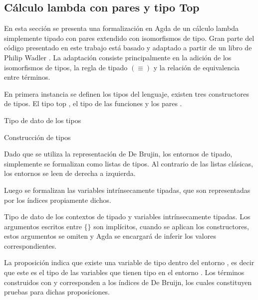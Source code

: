 \subsection{Cálculo lambda con pares y tipo Top}

En esta sección se presenta una formalización en Agda de un cálculo lambda simplemente tipado con pares extendido con isomorfismos de tipo.
Gran parte del código presentado en este trabajo está basado y adaptado a partir de un libro de Philip Wadler \cite{plfa}.
La adaptación consiste principalmente en la adición de los isomorfismos de tipos, la regla de tipado $(\equiv)$ y la relación de equivalencia entre términos.

En primera instancia se definen los tipos del lenguaje, existen tres constructores de tipos.
El tipo top \const{$\top$}, el tipo de las funciones \const{$\_\Rightarrow\_$} y los pares \const{$\_\times\_$}.

\begin{codigo}
	Tipo de dato de los tipos
	
\end{codigo}

\begin{example}
	Construcción de tipos
\end{example}

Dado que se utiliza la representación de De Brujin, los entornos de tipado, simplemente se formalizan como listas de tipos.
Al contrario de las listas clásicas, los entornos se leen de derecha a izquierda.

Luego se formalizan las variables intrínsecamente tipadas, que son representadas por los índices propiamente dichos.

\begin{codigo}
	Tipo de dato de los contextos de tipado y variables intrínsecamente tipadas.
	Los argumentos escritos entre $\{\}$ son implícitos, cuando se aplican los constructores, estos argumentos se omiten y Agda se encargará de inferir los valores correspondientes.
\end{codigo}

La proposición \bound{$\Gamma$} \const{$\ni$}  indica que existe una variable de tipo  dentro del entorno \bound{$\Gamma$}, es decir que este es el tipo de las variables que tienen tipo  en el entorno \bound{$\Gamma$}.
Los términos construidos con  y  corresponden a los índices de De Bruijn, los cuales constituyen pruebas para dichas proposiciones.

